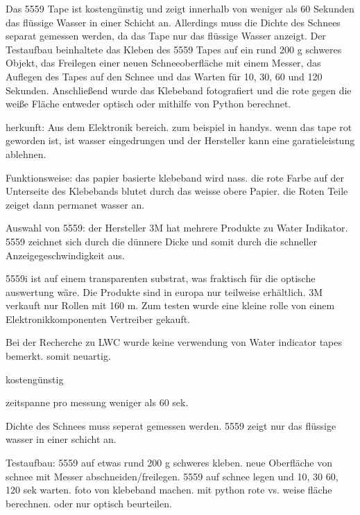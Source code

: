 Das 5559 Tape ist kostengünstig und zeigt innerhalb von weniger als 60 Sekunden das flüssige Wasser in einer Schicht an. Allerdings muss die Dichte des Schnees separat gemessen werden, da das Tape nur das flüssige Wasser anzeigt. Der Testaufbau beinhaltete das Kleben des 5559 Tapes auf ein rund 200 g schweres Objekt, das Freilegen einer neuen Schneeoberfläche mit einem Messer, das Auflegen des Tapes auf den Schnee und das Warten für 10, 30, 60 und 120 Sekunden. Anschließend wurde das Klebeband fotografiert und die rote gegen die weiße Fläche entweder optisch oder mithilfe von Python berechnet.

herkunft: Aus dem Elektronik bereich. zum beispiel in handys. wenn das tape rot geworden ist, ist wasser eingedrungen und der Hersteller kann eine garatieleistung ablehnen.

Funktionsweise: das papier basierte klebeband wird nass. die rote Farbe auf der Unterseite des Klebebands blutet durch das weisse obere Papier. die Roten Teile zeiget dann permanet wasser an.

Auswahl von 5559: der Hersteller 3M hat mehrere Produkte zu Water Indikator. 5559 zeichnet sich durch die dünnere Dicke und somit durch die schneller Anzeigegeschwindigkeit aus.

5559i ist auf einem transparenten substrat, was fraktisch für die optische auswertung wäre. Die Produkte sind in europa nur teilweise erhältlich. 3M verkauft nur Rollen mit 160 m. Zum testen wurde eine kleine rolle von einem Elektronikkomponenten Vertreiber gekauft.

Bei der Recherche zu LWC wurde keine verwendung von Water indicator tapes bemerkt. somit neuartig.

kostengünstig

zeitspanne pro messung weniger als 60 sek.

Dichte des Schnees muss seperat gemessen werden. 5559 zeigt nur das flüssige wasser in einer schicht an.

Testaufbau: 5559 auf etwas rund 200 g schweres kleben. neue Oberfläche von schnee mit Messer abschneiden/freilegen. 5559 auf schnee legen und 10, 30 60, 120 sek warten. foto von klebeband machen. mit python rote vs. weise fläche berechnen. oder nur optisch beurteilen.
\fi
